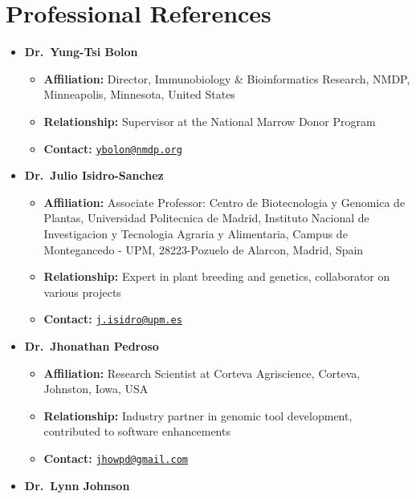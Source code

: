 \documentclass[11pt,a4paper,]{moderncv}
\providecommand{\tightlist}{%
	\setlength{\itemsep}{0pt}\setlength{\parskip}{0pt}}
\begin{document}
\section{Professional References}\label{professional-references}

\begin{itemize}
\tightlist
\item
  \textbf{Dr.~Yung-Tsi Bolon}

  \begin{itemize}
  \tightlist
  \item
    \textbf{Affiliation:} Director, Immunobiology \& Bioinformatics
    Research, NMDP, Minneapolis, Minnesota, United States
  \item
    \textbf{Relationship:} Supervisor at the National Marrow Donor
    Program
  \item
    \textbf{Contact:}
    \href{mailto:ybolon@nmdp.org}{\nolinkurl{ybolon@nmdp.org}}
  \end{itemize}
\item
  \textbf{Dr.~Julio Isidro-Sanchez}

  \begin{itemize}
  \tightlist
  \item
    \textbf{Affiliation:} Associate Professor: Centro de Biotecnologia y
    Genomica de Plantas, Universidad Politecnica de Madrid, Instituto
    Nacional de Investigacion y Tecnologia Agraria y Alimentaria, Campus
    de Montegancedo - UPM, 28223-Pozuelo de Alarcon, Madrid, Spain
  \item
    \textbf{Relationship:} Expert in plant breeding and genetics,
    collaborator on various projects
  \item
    \textbf{Contact:}
    \href{mailto:j.isidro@upm.es}{\nolinkurl{j.isidro@upm.es}}
  \end{itemize}
\item
  \textbf{Dr.~Jhonathan Pedroso}

  \begin{itemize}
  \tightlist
  \item
    \textbf{Affiliation:} Research Scientist at Corteva Agriscience,
    Corteva, Johnston, Iowa, USA
  \item
    \textbf{Relationship:} Industry partner in genomic tool development,
    contributed to software enhancements
  \item
    \textbf{Contact:}
    \href{mailto:jhowpd@gmail.com}{\nolinkurl{jhowpd@gmail.com}}
  \end{itemize}
\item
  \textbf{Dr.~Lynn Johnson}


\end{itemize}
\end{document}
